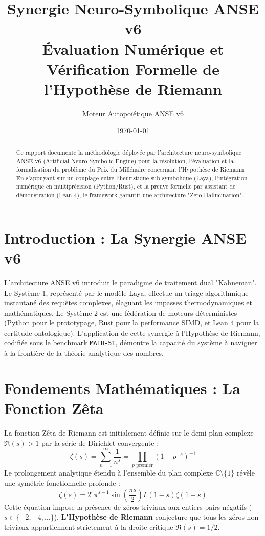 \documentclass[11pt, a4paper]{article}
\title{\textbf{Synergie Neuro-Symbolique ANSE v6}\\ \Large Évaluation Numérique et Vérification Formelle de l'Hypothèse de Riemann}
\author{Moteur Autopoïétique ANSE v6}
\date{\today}
\begin{document}
\maketitle

\begin{abstract}
Ce rapport documente la méthodologie déployée par l'architecture neuro-symbolique ANSE v6 (Artificial Neuro-Symbolic Engine) pour la résolution, l'évaluation et la formalisation du problème du Prix du Millénaire concernant l'Hypothèse de Riemann. En s'appuyant sur un couplage entre l'heuristique sub-symbolique (Laya), l'intégration numérique en multiprécision (Python/Rust), et la preuve formelle par assistant de démonstration (Lean 4), le framework garantit une architecture "Zero-Hallucination".
\end{abstract}

\section{Introduction : La Synergie ANSE v6}
L'architecture ANSE v6 introduit le paradigme de traitement dual "Kahneman". Le Système 1, représenté par le modèle Laya, effectue un triage algorithmique instantané des requêtes complexes, élaguant les impasses thermodynamiques et mathématiques. Le Système 2 est une fédération de moteurs déterministes (Python pour le prototypage, Rust pour la performance SIMD, et Lean 4 pour la certitude ontologique). L'application de cette synergie à l'Hypothèse de Riemann, codifiée sous le benchmark \texttt{MATH-51}, démontre la capacité du système à naviguer à la frontière de la théorie analytique des nombres.

\section{Fondements Mathématiques : La Fonction Zêta}
La fonction Zêta de Riemann est initialement définie sur le demi-plan complexe $\Re(s) > 1$ par la série de Dirichlet convergente :
\begin{equation}
    \zeta(s) = \sum_{n=1}^{\infty} \frac{1}{n^s} = \prod_{p \text{ premier}} \left(1 - p^{-s}\right)^{-1}
\end{equation}
Le prolongement analytique étendu à l'ensemble du plan complexe $\mathbb{C} \setminus \{1\}$ révèle une symétrie fonctionnelle profonde :
\begin{equation}
    \zeta(s) = 2^s \pi^{s-1} \sin\left(\frac{\pi s}{2}\right) \Gamma(1-s) \zeta(1-s)
\end{equation}
Cette équation impose la présence de zéros triviaux aux entiers pairs négatifs ($s \in \{-2, -4, \dots\}$). \textbf{L'Hypothèse de Riemann} conjecture que tous les zéros non-triviaux appartiennent strictement à la droite critique $\Re(s) = 1/2$.
\end{document}
